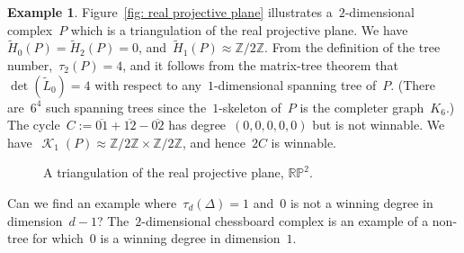 \documentclass[12pt]{article}
\newcommand{\Z}{\mathbb{Z}}
\newcommand{\R}{\mathbb{R}}
\newcommand{\tL}{\widetilde{L}}
\newcommand{\tH}{\widetilde{H}}
\newcommand{\proj}{\mathbb{P}}
\DeclareMathOperator{\crit}{\mathcal{K}}
\theoremstyle{definition}
\newtheorem{example}[theorem]{Example}
\theoremstyle{remark}
\begin{document}
\begin{example}
  Figure~\ref{fig: real projective plane} illustrates a~$2$-dimensional
  complex~$P$ which is a triangulation of the real projective plane.  We
  have~$\tH_0(P)=\tH_2(P)=0$, and~$\tH_1(P)\approx\Z/2\Z$.  From the definition
  of the tree number,~$\tau_2(P)=4$, and it follows from the matrix-tree theorem
  that~$\det(\tL_0)=4$ with respect to any~$1$-dimensional spanning tree
  of~$P$.  (There are~$6^4$ such spanning trees since the~$1$-skeleton
  of~$P$ is the completer graph~$K_6$.)  The
  cycle~$C:=\overline{01}+\overline{12}-\overline{02}$ has degree~$(0,0,0,0,0)$ but
  is not winnable.  We have~$\crit_1(P)\approx\Z/2\Z\times\Z/2\Z$, and
  hence~$2C$ is winnable.
\begin{figure}[ht] 
  \centering
{}
\caption{A triangulation of the real projective plane, $\R\proj^2$.}\label{fig:
real projective plane} 
\end{figure}
\end{example}

  Can we find an example where~$\tau_d(\Delta)=1$
and~$0$ is not a winning degree in dimension~$d-1$?  The~$2$-dimensional
chessboard complex is an example of a non-tree for which~$0$ is a winning degree
in dimension~$1$.
\end{document}
